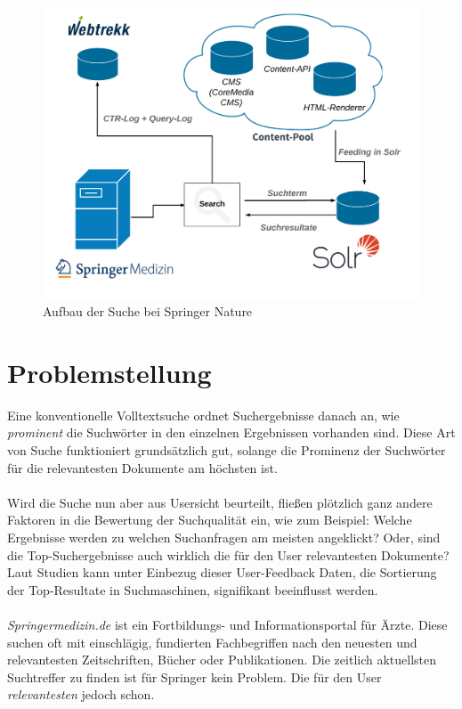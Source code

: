 \begin{figure}[H]
\centering
\includegraphics[width=\linewidth]{gfx/AufbauSucheSpringerNature}
\caption[Aufbau der Suche bei Springer Nature]{Aufbau der Suche bei Springer Nature}
\end{figure}

\section{Problemstellung}
\label{sec:Einfuehrung:Problemstellung}

Eine konventionelle Volltextsuche ordnet Suchergebnisse danach an, wie \textit{prominent} die Suchwörter in den einzelnen Ergebnissen vorhanden sind. Diese Art von Suche funktioniert grundsätzlich gut, solange die Prominenz der Suchwörter für die relevantesten Dokumente am höchsten ist. \cite{Bast2013}
\\
\\
Wird die Suche nun aber aus Usersicht beurteilt, fließen plötzlich ganz andere Faktoren in die Bewertung der Suchqualität ein, wie zum Beispiel: Welche Ergebnisse werden zu welchen Suchanfragen am meisten angeklickt? Oder, sind die Top-Suchergebnisse auch wirklich die für den User relevantesten Dokumente? Laut Studien kann unter Einbezug dieser User-Feedback Daten, die Sortierung der Top-Resultate in Suchmaschinen, signifikant beeinflusst werden. \cite{IWUSBI}
\\
\\
\textit{Springermedizin.de} ist ein Fortbildungs- und Informationsportal für Ärzte. Diese suchen oft mit einschlägig, fundierten Fachbegriffen nach den neuesten und relevantesten Zeitschriften, Bücher oder Publikationen. Die zeitlich aktuellsten Suchtreffer zu finden ist für Springer kein Problem. Die für den User \textit{relevantesten} jedoch schon. 

